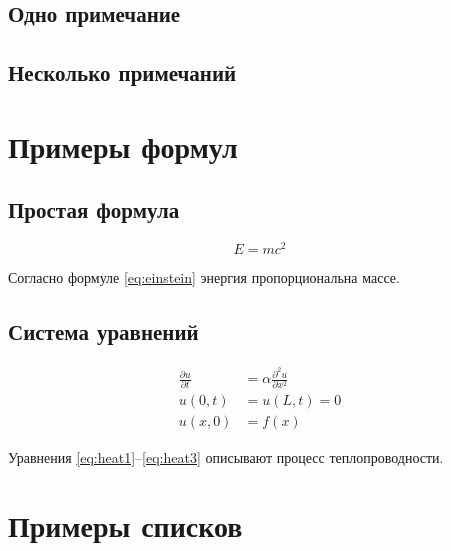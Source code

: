 \subsection{Одно примечание}


\subsection{Несколько примечаний}


\section{Примеры формул}

\subsection{Простая формула}

\begin{equation}
E = mc^2
\label{eq:einstein}
\end{equation}

Согласно формуле \ref{eq:einstein} энергия пропорциональна массе.

\subsection{Система уравнений}

\begin{align}
\frac{\partial u}{\partial t} &= \alpha \frac{\partial^2 u}{\partial x^2} \label{eq:heat1} \\
u(0,t) &= u(L,t) = 0 \label{eq:heat2} \\
u(x,0) &= f(x) \label{eq:heat3}
\end{align}

Уравнения \ref{eq:heat1}--\ref{eq:heat3} описывают процесс теплопроводности.

\section{Примеры списков}

